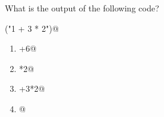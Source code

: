 \question
What is the output of the following code?

\lstinline@eval("1 + 3 * 2")@

\begin{enumerate}
\item {}+6@
\item {}*2@
\item {}+3*2@
\item {}@
\end{enumerate}

